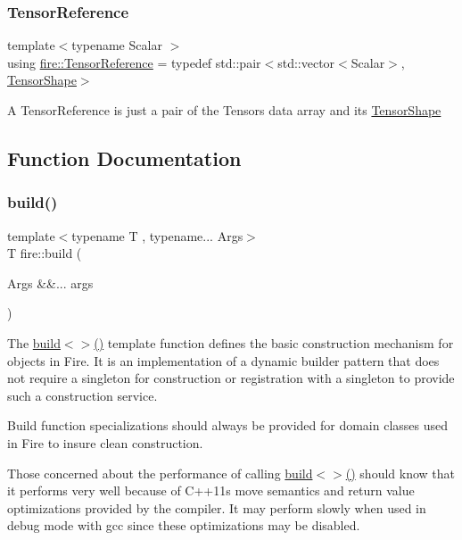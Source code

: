 \subsubsection{\texorpdfstring{Tensor\+Reference}{TensorReference}}
{\footnotesize\ttfamily template$<$typename Scalar $>$ \\
using \hyperlink{a00171_a1bf491fd1c876e2808648b2fd291e3dd}{fire\+::\+Tensor\+Reference} = typedef std\+::pair$<$std\+::vector$<$Scalar$>$, \hyperlink{a00850}{Tensor\+Shape}$>$}

A Tensor\+Reference is just a pair of the Tensors data array and its \hyperlink{a00850}{Tensor\+Shape} 

\subsection{Function Documentation}
\mbox{\label{a00171_ac7deda7dc809d0d45b8bfed78c8232f9}} 
\subsubsection{\texorpdfstring{build()}{build()}\hspace{0.1cm}{\footnotesize\ttfamily [1/6]}}
{\footnotesize\ttfamily template$<$typename T , typename... Args$>$ \\
T fire\+::build (\begin{DoxyParamCaption}\item[{Args \&\&...}]{args }\end{DoxyParamCaption})}

The \hyperlink{a00171_abca66b4f2a1543308b663714bd8b4855}{build$<$$>$()} template function defines the basic construction mechanism for objects in Fire. It is an implementation of a dynamic builder pattern that does not require a singleton for construction or registration with a singleton to provide such a construction service.

Build function specializations should always be provided for domain classes used in Fire to insure clean construction.

Those concerned about the performance of calling \hyperlink{a00171_abca66b4f2a1543308b663714bd8b4855}{build$<$$>$()} should know that it performs very well because of C++11\textquotesingle{}s move semantics and return value optimizations provided by the compiler. It may perform slowly when used in debug mode with gcc since these optimizations may be disabled.


